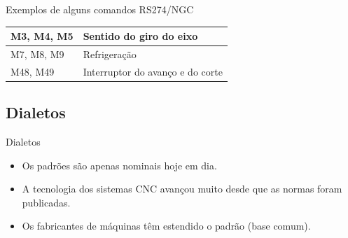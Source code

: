 \documentclass[aspectratio=169]{beamer}
\begin{document}
{\begin{frame}{Exemplos de alguns comandos RS274/NGC}
\begin{table}[H]
\begin{tabular}{p{7cm}|p{5cm}}
      \hline
      \scriptsize{M3, M4, M5}
      & \scriptsize{Sentido do giro do eixo} \\
  
      \hline
      \scriptsize{M7, M8, M9}
      & \scriptsize{Refrigera\c c\~ao} \\
  
      \hline
      \scriptsize{M48, M49}
      & \scriptsize{Interruptor do avan\c co e do corte} \\

      \hline
  
    \end{tabular}
  \end{table}

\end{frame}



\subsection{Dialetos}

\begin{frame}{Dialetos}
  \begin{itemize}
  \item {
    Os padrões são apenas nominais hoje em dia.     
  }
  \item {   
    A tecnologia dos sistemas CNC avançou muito desde que as normas foram publicadas.
  }
  \item {
    Os fabricantes de máquinas têm estendido o padrão (base comum). 
  }
  \end{itemize}
\end{frame}



}
\end{document}
